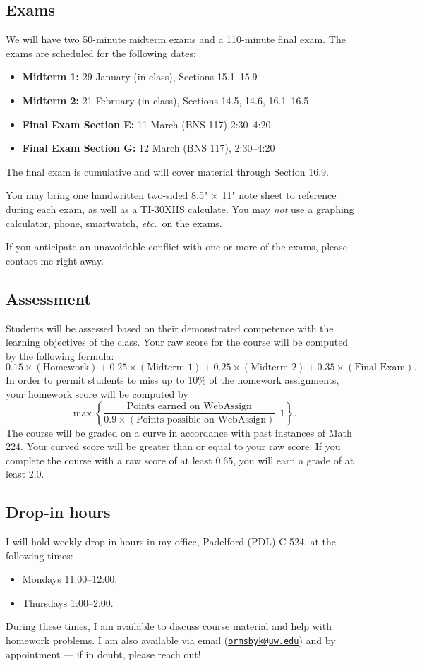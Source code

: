 \documentclass[11pt,twoside]{amsart}
\begin{document}
\subsection*{Exams}
We will have two 50-minute midterm exams and a 110-minute final exam. The exams are scheduled for the following dates:
\begin{itemize}
\item \textbf{Midterm 1:} 29 January (in class), Sections 15.1--15.9
\item \textbf{Midterm 2:} 21 February (in class), Sections 14.5, 14.6, 16.1--16.5
\item \textbf{Final Exam Section E:} 11 March (BNS 117) 2:30--4:20
\item \textbf{Final Exam Section G:} 12 March (BNS 117), 2:30--4:20
\end{itemize}
\noindent The final exam is cumulative and will cover material through Section 16.9.

You may bring one handwritten two-sided 8.5"$\,{\times}\,$11" note sheet to reference during each exam, as well as a TI-30XIIS calculate. You may \emph{not} use a graphing calculator, phone, smartwatch, \emph{etc.}~on the exams.

If you anticipate an unavoidable conflict with one or more of the exams, please contact me right away.

\subsection*{Assessment}
Students will be assessed based on their demonstrated competence with the learning objectives of the class. Your raw score for the course will be computed by the following formula:
\[
  0.15\times (\text{Homework}) + 0.25\times (\text{Midterm 1}) + 0.25\times (\text{Midterm 2}) + 0.35\times (\text{Final Exam}).
\]
In order to permit students to miss up to 10\% of the homework assignments, your homework score will be computed by
\[
  \max\left\{\frac{\text{Points earned on WebAssign}}{0.9\times (\text{Points possible on WebAssign})},1\right\}.
\]
The course will be graded on a curve in accordance with past instances of Math 224. Your curved score will be greater than or equal to your raw score. If you complete the course with a raw score of at least $0.65$, you will earn a grade of at least 2.0.

\subsection*{Drop-in hours}
I will hold weekly drop-in hours in my office, Padelford (PDL) C-524, at the following times:
\begin{itemize}
\item Mondays 11:00--12:00,
\item Thursdays 1:00--2:00.
\end{itemize}
During these times, I am available to discuss course material and help with homework problems. I am also available via email (\href{mailto:ormsbyk@uw.edu}{\nolinkurl{ormsbyk@uw.edu}}) and by appointment --- if in doubt, please reach out!
\end{document}
